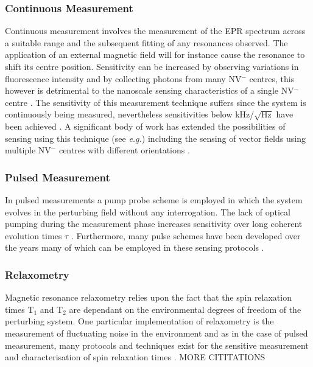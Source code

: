 \documentclass[10pt]{article}
\begin{document}
\begin{multicols}{2}
\subsubsection{Continuous Measurement}
Continuous measurement involves the measurement of the EPR spectrum across a suitable range and the subsequent fitting of any resonances observed. The application of an external magnetic field will for instance cause the resonance to shift its centre position. Sensitivity can be increased by observing variations in fluorescence intensity and by collecting photons from many NV$^-$ centres, this however is detrimental to the nanoscale sensing characteristics of a single NV$^-$ centre \cite{schirhagl2014nitrogen}. The sensitivity of this measurement technique suffers since the system is continuously being measured, nevertheless sensitivities below kHz/$\sqrt{\textrm{Hz}}$ have been achieved \cite{acosta2010broadband}. A significant body of work has extended the possibilities of sensing using this technique (see \textit{e.g.}\cite{haberle2013high,schoenfeld2011real}) including the sensing of vector fields using multiple NV$^-$ centres with different orientations \cite{maertz2010vector}.

\subsubsection{Pulsed Measurement}
In pulsed measurements a pump probe scheme is employed in which the system evolves in the perturbing field without any interrogation. The lack of optical pumping during the measurement phase increases sensitivity over long coherent evolution times $\tau$ \cite{maze2008nanoscale}. Furthermore, many pulse schemes have been developed over the years many of which can be employed in these sensing protocols \cite{schirhagl2014nitrogen}.

\subsubsection{Relaxometry}
Magnetic resonance relaxometry relies upon the fact that the spin relaxation times T$_1$ and T$_2$ are dependant on the environmental degrees of freedom of the perturbing system. One particular implementation of relaxometry is the measurement of fluctuating noise in the environment and as in the case of pulsed measurement, many protocols and techniques exist for the sensitive measurement and characterisation of spin relaxation times \cite{steinert2013magnetic}. MORE CITITATIONS



\end{multicols}
\end{document}
